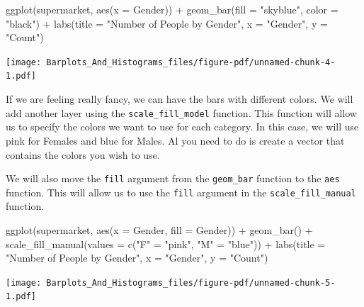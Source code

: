 \documentclass[
  letterpaper,
  DIV=11,
  numbers=noendperiod]{scrreprt}
\newenvironment{Shaded}{\begin{snugshade}}{\end{snugshade}}
\newcommand{\AttributeTok}[1]{\textcolor[rgb]{0.40,0.45,0.13}{#1}}
\newcommand{\FunctionTok}[1]{\textcolor[rgb]{0.28,0.35,0.67}{#1}}
\newcommand{\NormalTok}[1]{\textcolor[rgb]{0.00,0.23,0.31}{#1}}
\newcommand{\OtherTok}[1]{\textcolor[rgb]{0.00,0.23,0.31}{#1}}
\newcommand{\SpecialCharTok}[1]{\textcolor[rgb]{0.37,0.37,0.37}{#1}}
\newcommand{\StringTok}[1]{\textcolor[rgb]{0.13,0.47,0.30}{#1}}
\begin{document}
\begin{Shaded}
\begin{Highlighting}[]
\FunctionTok{ggplot}\NormalTok{(supermarket, }\FunctionTok{aes}\NormalTok{(}\AttributeTok{x =}\NormalTok{ Gender)) }\SpecialCharTok{+}
  \FunctionTok{geom\_bar}\NormalTok{(}\AttributeTok{fill =} \StringTok{"skyblue"}\NormalTok{, }\AttributeTok{color =} \StringTok{"black"}\NormalTok{) }\SpecialCharTok{+}
  \FunctionTok{labs}\NormalTok{(}\AttributeTok{title =} \StringTok{"Number of People by Gender"}\NormalTok{,}
       \AttributeTok{x =} \StringTok{"Gender"}\NormalTok{,}
       \AttributeTok{y =} \StringTok{"Count"}\NormalTok{)}
\end{Highlighting}
\end{Shaded}

\texttt{[image: Barplots\_And\_Histograms\_files/figure-pdf/unnamed-chunk-4-1.pdf]}

If we are feeling really fancy, we can have the bars with different
colors. We will add another layer using the \texttt{scale\_fill\_model}
function. This function will allow us to specify the colors we want to
use for each category. In this case, we will use pink for Females and
blue for Males. Al you need to do is create a vector that contains the
colors you wish to use.

We will also move the \texttt{fill} argument from the \texttt{geom\_bar}
function to the \texttt{aes} function. This will allow us to use the
\texttt{fill} argument in the \texttt{scale\_fill\_manual} function.

\begin{Shaded}
\begin{Highlighting}[]
\FunctionTok{ggplot}\NormalTok{(supermarket, }\FunctionTok{aes}\NormalTok{(}\AttributeTok{x =}\NormalTok{ Gender, }\AttributeTok{fill =}\NormalTok{ Gender)) }\SpecialCharTok{+}
  \FunctionTok{geom\_bar}\NormalTok{() }\SpecialCharTok{+}
  \FunctionTok{scale\_fill\_manual}\NormalTok{(}\AttributeTok{values =} \FunctionTok{c}\NormalTok{(}\StringTok{"F"} \OtherTok{=} \StringTok{"pink"}\NormalTok{, }\StringTok{"M"} \OtherTok{=} \StringTok{"blue"}\NormalTok{)) }\SpecialCharTok{+}
  \FunctionTok{labs}\NormalTok{(}\AttributeTok{title =} \StringTok{"Number of People by Gender"}\NormalTok{,}
       \AttributeTok{x =} \StringTok{"Gender"}\NormalTok{,}
       \AttributeTok{y =} \StringTok{"Count"}\NormalTok{)}
\end{Highlighting}
\end{Shaded}

\texttt{[image: Barplots\_And\_Histograms\_files/figure-pdf/unnamed-chunk-5-1.pdf]}
\end{document}
